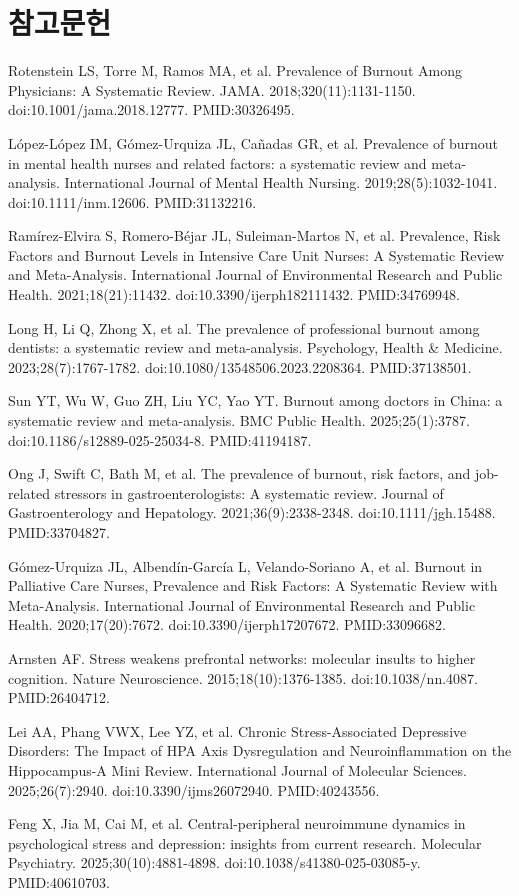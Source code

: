 \documentclass[11pt,oneside]{book}
\newcommand{\refstart}{\par\begingroup\footnotesize\setlength{\parskip}{2.5pt}\raggedright}
\newcommand{\reff}[2]{\par\hangindent=7mm\hangafter=1\noindent[#1]\hspace{2mm}#2\par}
\begin{document}
\section*{참고문헌}
\refstart
\reff{1}{Rotenstein LS, Torre M, Ramos MA, et al. Prevalence of Burnout Among Physicians: A Systematic Review. JAMA. 2018;320(11):1131-1150. doi:10.1001/jama.2018.12777. PMID:30326495.}
\reff{2}{López-López IM, Gómez-Urquiza JL, Cañadas GR, et al. Prevalence of burnout in mental health nurses and related factors: a systematic review and meta-analysis. International Journal of Mental Health Nursing. 2019;28(5):1032-1041. doi:10.1111/inm.12606. PMID:31132216.}
\reff{3}{Ramírez-Elvira S, Romero-Béjar JL, Suleiman-Martos N, et al. Prevalence, Risk Factors and Burnout Levels in Intensive Care Unit Nurses: A Systematic Review and Meta-Analysis. International Journal of Environmental Research and Public Health. 2021;18(21):11432. doi:10.3390/ijerph182111432. PMID:34769948.}
\reff{4}{Long H, Li Q, Zhong X, et al. The prevalence of professional burnout among dentists: a systematic review and meta-analysis. Psychology, Health \& Medicine. 2023;28(7):1767-1782. doi:10.1080/13548506.2023.2208364. PMID:37138501.}
\reff{5}{Sun YT, Wu W, Guo ZH, Liu YC, Yao YT. Burnout among doctors in China: a systematic review and meta-analysis. BMC Public Health. 2025;25(1):3787. doi:10.1186/s12889-025-25034-8. PMID:41194187.}
\reff{6}{Ong J, Swift C, Bath M, et al. The prevalence of burnout, risk factors, and job-related stressors in gastroenterologists: A systematic review. Journal of Gastroenterology and Hepatology. 2021;36(9):2338-2348. doi:10.1111/jgh.15488. PMID:33704827.}
\reff{7}{Gómez-Urquiza JL, Albendín-García L, Velando-Soriano A, et al. Burnout in Palliative Care Nurses, Prevalence and Risk Factors: A Systematic Review with Meta-Analysis. International Journal of Environmental Research and Public Health. 2020;17(20):7672. doi:10.3390/ijerph17207672. PMID:33096682.}
\reff{8}{Arnsten AF. Stress weakens prefrontal networks: molecular insults to higher cognition. Nature Neuroscience. 2015;18(10):1376-1385. doi:10.1038/nn.4087. PMID:26404712.}
\reff{9}{Lei AA, Phang VWX, Lee YZ, et al. Chronic Stress-Associated Depressive Disorders: The Impact of HPA Axis Dysregulation and Neuroinflammation on the Hippocampus-A Mini Review. International Journal of Molecular Sciences. 2025;26(7):2940. doi:10.3390/ijms26072940. PMID:40243556.}
\reff{10}{Feng X, Jia M, Cai M, et al. Central-peripheral neuroimmune dynamics in psychological stress and depression: insights from current research. Molecular Psychiatry. 2025;30(10):4881-4898. doi:10.1038/s41380-025-03085-y. PMID:40610703.}
\end{document}
